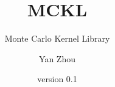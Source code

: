 \title{MCKL}
\subtitle{Monte Carlo Kernel Library}
\author{Yan Zhou}
\date{version 0.1}

\maketitle
\tableofcontents
\listoftables
